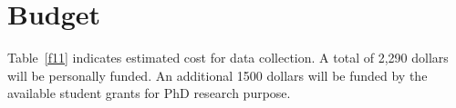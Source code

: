 \section{Budget}

Table~\ref{f11} indicates estimated cost for data collection. A total of 2,290 dollars will be personally funded. An additional 1500 dollars will be funded by the available student grants for PhD research purpose. 
\begin{table}[H]
\centering
\caption{Proposed budget for data collection}
\label{f11}
\end{table}
